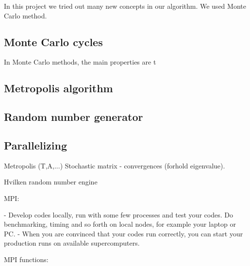 In this project we tried out many new concepts in our algorithm. We used Monte Carlo method. 


\subsection{Monte Carlo cycles}

In Monte Carlo methods, the main properties  are t





\subsection{Metropolis algorithm}

\subsection{Random number generator}

\subsection{Parallelizing}



Metropolis (T,A,...)
	Stochastic matrix  - convergences (forhold eigenvalue).
	
	Hvilken random number engine
	
MPI:	
	
- Develop codes locally, run with some few processes and test your codes. Do benchmarking, timing and so forth on local nodes, for example your laptop or PC.
- When you are convinced that your codes run correctly, you can start your production runs on available supercomputers.
	
	
MPI functions:
%
%
%
%
%
%
%

